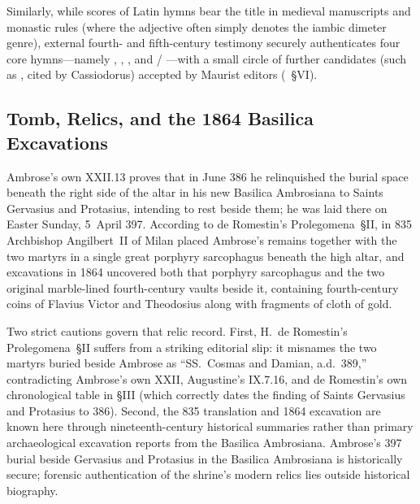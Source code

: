 Similarly, while scores of Latin hymns bear the title  in medieval manuscripts and monastic rules (where the adjective often simply denotes the iambic dimeter genre), external fourth- and fifth-century testimony securely authenticates four core hymns---namely , , , and  / ---with a small circle of further candidates (such as , cited by Cassiodorus) accepted by Maurist editors (~\S VI).

\subsection{Tomb, Relics, and the 1864 Basilica Excavations}

Ambrose's own  XXII.13 proves that in June 386 he relinquished the burial space beneath the right side of the altar in his new Basilica Ambrosiana to Saints Gervasius and Protasius, intending to rest beside them; he was laid there on Easter Sunday, 5~April 397. According to de Romestin's Prolegomena~\S II, in 835 Archbishop Angilbert~II of Milan placed Ambrose's remains together with the two martyrs in a single great porphyry sarcophagus beneath the high altar, and excavations in 1864 uncovered both that porphyry sarcophagus and the two original marble-lined fourth-century vaults beside it, containing fourth-century coins of Flavius Victor and Theodosius along with fragments of cloth of gold.

Two strict cautions govern that relic record. First, H.~de Romestin's Prolegomena~\S II suffers from a striking editorial slip: it misnames the two martyrs buried beside Ambrose as ``SS.\ Cosmas and Damian, a.d.~389,'' contradicting Ambrose's own  XXII, Augustine's  IX.7.16, and de Romestin's own chronological table in \S III (which correctly dates the finding of Saints Gervasius and Protasius to 386). Second, the 835 translation and 1864 excavation are known here through nineteenth-century historical summaries rather than primary archaeological excavation reports from the Basilica Ambrosiana. Ambrose's 397 burial beside Gervasius and Protasius in the Basilica Ambrosiana is historically secure; forensic authentication of the shrine's modern relics lies outside historical biography.
